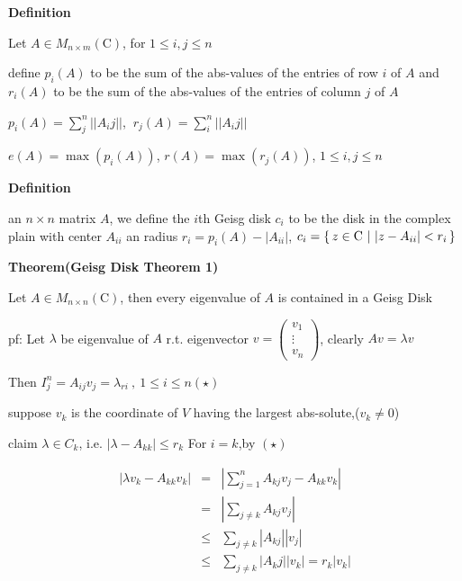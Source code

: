 \textbf{Definition} 

\begin{tcolorbox}
	Let $A \in M_{n \times m}(\mathrm{C})$, for $1 \leq i,j \leq n$
	
	define $p_i(A)$ to be the sum of the abs-values of the entries of row $i$ of $A$ and $r_i(A)$ to be the sum of the abs-values of the entries of column $j$ of $A$
	
	$p_i(A) = \sum^n_j  ||A_ij||$,  $~r_j(A) = \sum^n_i  ||A_ij||$
	
	$e(A) = \max(p_i(A))$, $r(A) = \max(r_j(A))$, $1 \leq i,j \leq n$
\end{tcolorbox}


\textbf{Definition}

\begin{tcolorbox}
	an $n \times n$ matrix $A$, we define the $i$th Geisg disk $c_i$ to be the disk in the complex plain with center $A_{ii}$ an radius $r_i = p_i(A) - |A_{ii}|$, $c_i = \left\{ \,z \in \mathrm{C}~| ~|z - A_{ii}| < r_i \,\right\}$
\end{tcolorbox}

\newpage

\textbf{Theorem(Geisg Disk Theorem 1)}

\begin{tcolorbox}
	Let $A \in M_{n \times n}(\mathrm{C})$, then every eigenvalue of $A$ is contained in a Geisg Disk
	
	pf: Let $\lambda$ be eigenvalue of $A$ r.t. eigenvector $v = \left( \begin{matrix} v_1\\\vdots \\ v_n	\end{matrix} \right)$, clearly $Av = \lambda v$
	
	Then $I^n_j = A_{ij}v_j = \lambda_{ri}~,~ 1 \leq i \leq n (\star)$
	
	suppose $v_k$ is the coordinate of $V$ having the largest abs-solute,($v_k \neq 0$)
	
	claim $\lambda \in C_k$, i.e. $|\lambda - A_{kk} | \leq r_k$ For $i = k$,by $(\star)$
	
	\begin{eqnarray*}
		|\lambda v_k - A_{kk}v_k| &=& |\sum^n_{j=1}A_{kj}v_j - A_{kk}v_k|\\
		&=& |\sum_{j \neq k} A_{kj}v_j|\\
		&\leq & \sum_{j \neq k}|A_{kj}||v_j|\\
		&\leq & \sum_{j \neq k}|A_kj||v_k| = r_k|v_k|
	\end{eqnarray*}
	
\end{tcolorbox}

